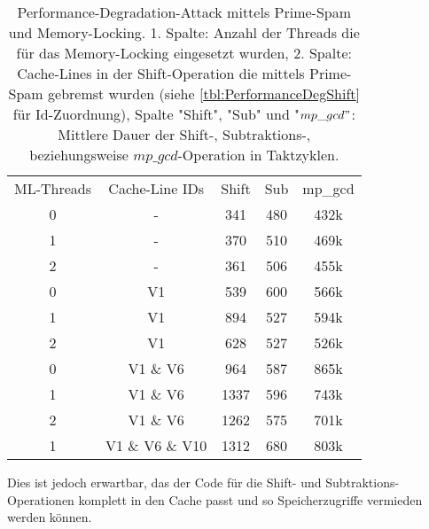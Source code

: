 \begin{table}[h]
\caption{Performance-Degradation-Attack mittels Prime-Spam und Memory-Locking. 1. Spalte: Anzahl der Threads die für das Memory-Locking eingesetzt wurden, 2. Spalte: Cache-Lines in der Shift-Operation die mittels Prime-Spam gebremst wurden (siehe \ref{tbl:PerformanceDegShift} für Id-Zuordnung), Spalte "Shift", "Sub" und "$mp\_gcd"$: Mittlere Dauer der Shift-, Subtraktions-, beziehungsweise $mp\_gcd$-Operation in Taktzyklen.}
\label{tbl:MemoryLockingResults}
\begin{tabular}{ccccc}
ML-Threads & Cache-Line IDs     & Shift & Sub & mp\_gcd \\
0                   & -               & 341   & 480 & 432k    \\
1                   & -               & 370   & 510 & 469k    \\
2                   & -               & 361   & 506 & 455k    \\
0                   & V1              & 539   & 600 & 566k    \\
1                   & V1              & 894   & 527 & 594k    \\
2                   & V1              & 628   & 527 & 526k    \\
0                   & V1 \& V6        & 964   & 587 & 865k    \\
1                   & V1 \& V6        & 1337  & 596 & 743k    \\
2                   & V1 \& V6        & 1262  & 575 & 701k    \\
1                   & V1 \& V6 \& V10 & 1312  & 680 & 803k   
\end{tabular}
\end{table}

Dies ist jedoch erwartbar, das der Code für die Shift- und Subtraktions-Operationen komplett in den Cache passt und so Speicherzugriffe vermieden werden können.

